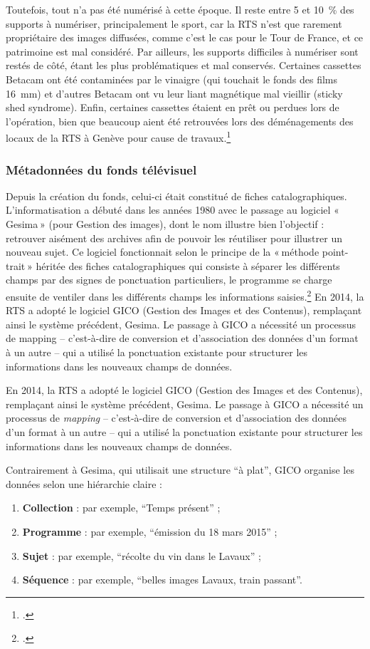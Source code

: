 Toutefois, tout n’a pas été numérisé à cette époque. Il reste entre 5 et 10 \% des supports à numériser, principalement le sport, car la RTS n’est que rarement propriétaire des images diffusées, comme c’est le cas pour le Tour de France, et ce patrimoine est mal considéré. Par ailleurs, les supports difficiles à numériser sont restés de côté, étant les plus problématiques et mal conservés. Certaines cassettes Betacam ont été contaminées par le vinaigre (qui touchait le fonds des films 16 mm) et d’autres Betacam ont vu leur liant magnétique mal vieillir (sticky shed syndrome). Enfin, certaines cassettes étaient en prêt ou perdues lors de l’opération, bien que beaucoup aient été retrouvées lors des déménagements des locaux de la RTS à Genève pour cause de travaux.\footcite{barcella2024a}

\subsubsection{Métadonnées du fonds télévisuel}

Depuis la création du fonds, celui-ci était constitué de fiches catalographiques. L’informatisation a débuté dans les années 1980 avec le passage au logiciel « Gesima » (pour Gestion des images), dont le nom illustre bien l’objectif : retrouver aisément des archives afin de pouvoir les réutiliser pour illustrer un nouveau sujet. Ce logiciel fonctionnait selon le principe de la « méthode point-trait » héritée des fiches catalographiques qui consiste à séparer les différents champs par des signes de ponctuation particuliers, le programme se charge ensuite de ventiler dans les différents champs les informations saisies.\footcite{barcella2024a}
En 2014, la RTS a adopté le logiciel GICO (Gestion des Images et des Contenus), remplaçant ainsi le système précédent, Gesima. Le passage à GICO a nécessité un processus de mapping – c'est-à-dire de conversion et d'association des données d'un format à un autre – qui a utilisé la ponctuation existante pour structurer les informations dans les nouveaux champs de données.
	
	En 2014, la RTS a adopté le logiciel GICO (Gestion des Images et des Contenus), remplaçant ainsi le système précédent, Gesima. Le passage à GICO a nécessité un processus de \emph{mapping} – c'est-à-dire de conversion et d'association des données d'un format à un autre – qui a utilisé la ponctuation existante pour structurer les informations dans les nouveaux champs de données.
	
	Contrairement à Gesima, qui utilisait une structure \enquote{à plat}, GICO organise les données selon une hiérarchie claire :
	\begin{enumerate}
		\item \textbf{Collection} : par exemple, \enquote{Temps présent} ;
		\item \textbf{Programme} : par exemple, \enquote{émission du 18 mars 2015} ; 
		\item \textbf{Sujet} : par exemple, \enquote{récolte du vin dans le Lavaux} ;
		\item \textbf{Séquence} : par exemple, \enquote{belles images Lavaux, train passant}.
	\end{enumerate}
	
